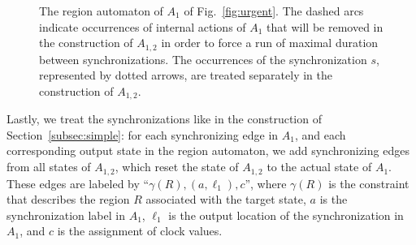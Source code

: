 \documentclass{LMCS}
\theoremstyle{plain}\newtheorem*{prop11}{Proposition~\ref{prop:states} bis}
\begin{document}
\begin{figure}[tp]
  \caption[Region automaton of $A_1$ of Fig.~\ref{fig:urgent}]
  {The region automaton of $A_1$ of Fig.~\ref{fig:urgent}. The dashed arcs
    indicate occurrences of internal actions of $A_1$ that will be removed in
    the construction of $A_{1, 2}$ in order to force a run of maximal duration
    between synchronizations. The occurrences of the synchronization $s$,
    represented by dotted arrows, are treated separately in the construction
    of $A_{1, 2}$.}
  \label{fig:region}
\end{figure}









Lastly, we treat the synchronizations like in the construction of
Section~\ref{subsec:simple}: for each synchronizing edge in $A_1$, and each
corresponding output state in the region automaton,
we add synchronizing edges from all states of $A_{1,2}$, which reset the state
of $A_{1,2}$ to the actual state of $A_1$. These edges are labeled by
``$\gamma(R),(a,\ell_1),c$'', where $\gamma(R)$ is the constraint that
describes the region $R$ associated with the target state, $a$ is the
synchronization label in $A_1$, $\ell_1$ is the output location of the
synchronization in $A_1$, and $c$ is the assignment of clock values.
\end{document}
